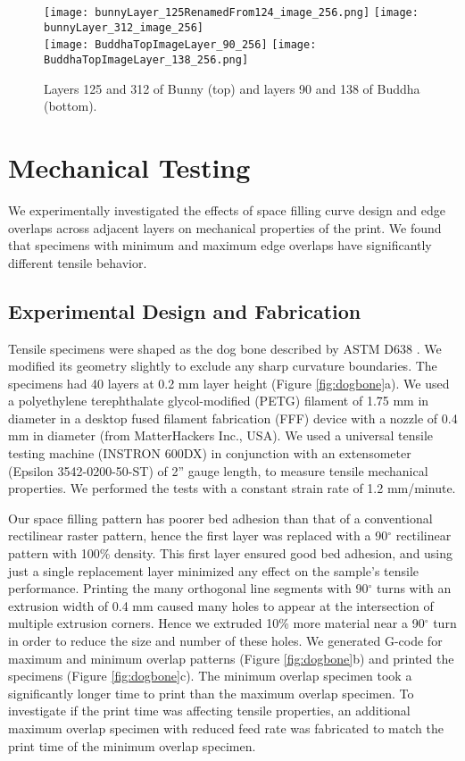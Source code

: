 \begin{figure*}[hbp!] 
  \centering
  \texttt{[image: bunnyLayer\_125RenamedFrom124\_image\_256.png]}
  \quad
  \texttt{[image: bunnyLayer\_312\_image\_256]}\\
  \texttt{[image: BuddhaTopImageLayer\_90\_256]}
  \quad
  \texttt{[image: BuddhaTopImageLayer\_138\_256.png]}  
  \caption{\label{fig:bunnybuddha} Layers 125 and 312 of Bunny (top) and layers 90 and 138 of Buddha (bottom).}  	
\end{figure*}
\section{Mechanical Testing} \label{sec:mechtest}

We experimentally investigated the effects of space filling curve design and edge overlaps across adjacent layers on mechanical properties of the print.
We found that specimens with minimum and maximum edge overlaps have significantly different tensile behavior.

\subsection{Experimental Design and Fabrication}

Tensile specimens were shaped as the dog bone described by ASTM D638 \cite{astm2003}.
We modified its geometry slightly to exclude any sharp curvature boundaries.
The specimens had 40 layers at 0.2 mm layer height (Figure \ref{fig:dogbone}a).
We used a polyethylene terephthalate glycol-modified (PETG) filament of 1.75 mm in diameter in a desktop fused filament fabrication (FFF) device with a nozzle of 0.4 mm in diameter (from MatterHackers Inc., USA).
We used a universal tensile testing machine (INSTRON 600DX) in conjunction with an extensometer (Epsilon 3542-0200-50-ST) of 2'' gauge length, to measure tensile mechanical properties.
We performed the tests with a constant strain rate of 1.2 mm/minute.

Our space filling pattern has poorer bed adhesion than that of a conventional rectilinear raster pattern, hence the first layer was replaced with a 90$^\circ$ rectilinear pattern with 100\% density.
This first layer ensured good bed adhesion, and using just a single replacement layer minimized any effect on the sample’s tensile performance.
Printing the many orthogonal line segments with 90$^\circ$ turns with an extrusion width of 0.4 mm caused many holes to appear at the intersection of multiple extrusion corners.
Hence we extruded 10\% more material near a 90$^\circ$ turn in order to reduce the size and number of these holes.
We generated G-code for maximum and minimum overlap patterns (Figure \ref{fig:dogbone}b) and printed the specimens (Figure \ref{fig:dogbone}c).
The minimum overlap specimen took a significantly longer time to print than the maximum overlap specimen.
To investigate if the print time was affecting tensile properties, an additional maximum overlap specimen with reduced feed rate was fabricated to match the print time of the minimum overlap specimen.

